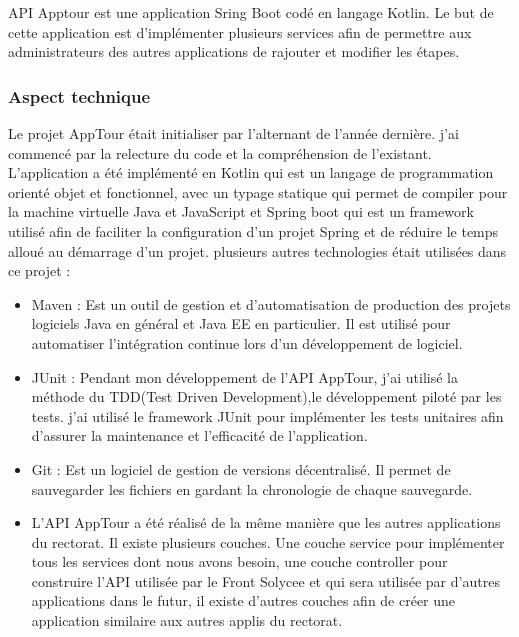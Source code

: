 \documentclass[12pt]{article}
\begin{document}
API Apptour est une application Sring Boot codé en langage Kotlin. Le but de cette application est d’implémenter plusieurs  services afin de permettre aux administrateurs des autres applications de rajouter et modifier les étapes.


\subsubsection{Aspect technique}

 Le projet AppTour était initialiser par l'alternant de l'année dernière. j'ai commencé par la relecture du code et la compréhension de l'existant. L'application a été implémenté en Kotlin qui est un langage de programmation orienté objet et fonctionnel, avec un typage statique qui permet de compiler pour la machine virtuelle Java et JavaScript et Spring boot qui est un framework utilisé afin de faciliter la configuration d'un projet Spring et de réduire le temps alloué au démarrage d'un projet. plusieurs autres technologies était utilisées dans ce projet :

\begin{itemize}
\item Maven :  Est un outil de gestion et d'automatisation de production des projets logiciels Java en général et Java EE en particulier. Il est utilisé pour automatiser l'intégration continue lors d'un développement de logiciel.

\item JUnit : Pendant mon développement de l'API AppTour, j'ai utilisé la méthode du TDD(Test Driven Development),le développement piloté par les tests. j'ai utilisé le framework JUnit pour implémenter les tests unitaires afin d'assurer la maintenance et l'efficacité de l’application.

\item Git : Est un logiciel de gestion de versions décentralisé. Il permet de sauvegarder les fichiers en gardant la chronologie de chaque sauvegarde.

\item L'API AppTour a été réalisé de la même manière que les autres applications du rectorat. Il existe plusieurs couches. Une couche service pour implémenter tous les services dont nous avons besoin, une couche controller pour construire l'API utilisée par le Front Solycee et qui sera utilisée par d'autres applications dans le futur, il existe d'autres couches afin de créer une application similaire aux autres applis du rectorat.

\end{itemize}
\end{document}
